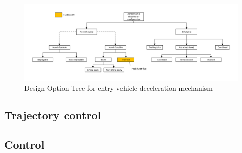 \begin{figure}[H]
\centering
\hspace{-10mm}
\includegraphics[width = 1.1\textwidth]{Figure/DOT_configuration.pdf}
\caption{Design Option Tree for entry vehicle deceleration mechanism}
\label{fig:dotconfig}
\end{figure}

\subsection{Trajectory control} \label{sec:DOTtrajectory}

\subsection{Control} \label{sec:DOTcontrol}
